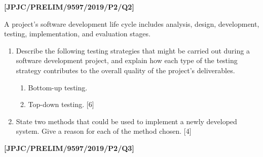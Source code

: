 \item \textbf{{[}JPJC/PRELIM/9597/2019/P2/Q2{]} }

A project\textquoteright s software development life cycle includes
analysis, design, development, testing, implementation, and evaluation
stages.
\begin{enumerate}
\item Describe the following testing strategies that might be carried out
during a software development project, and explain how each type of
the testing strategy contributes to the overall quality of the project\textquoteright s
deliverables. 
\begin{enumerate}
\item Bottom-up testing. 
\item Top-down testing. \hfill{}{[}6{]}
\end{enumerate}
\item State two methods that could be used to implement a newly developed
system. Give a reason for each of the method chosen. \hfill{}{[}4{]}
\end{enumerate}
\item \textbf{{[}JPJC/PRELIM/9597/2019/P2/Q3{]} }
